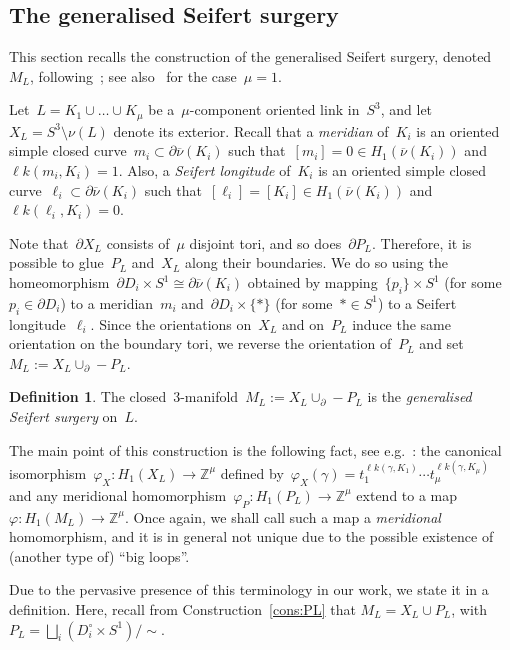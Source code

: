 \documentclass[10.9pt,a4paper]{amsart}
\theoremstyle{definition}
\newtheorem{definition}[theorem]{Definition}
\theoremstyle{remark}
\newcommand{\Z}{\mathbb{Z}}
\newcommand{\lk}{\ell k}
\newcommand{\onu}{\overline{\nu}}
\begin{document}
\color{black}

\subsection{The generalised Seifert surgery}
\label{subsec:M_L}
This section recalls the construction of the generalised Seifert surgery,  denoted $M_L$, following~\cite{ToffoliThesis,Toffoli,CMP,CFP}; see also~\cite{NagelPowell} for the case~$\mu=1$.
\medskip


Let~$L=K_1\cup\dots\cup K_\mu$ be a~$\mu$-component oriented link in~$S^3$, and let~$X_L=S^3\setminus\nu(L)$ denote its exterior.
Recall that a {\em meridian\/} of~$K_i$ is an oriented simple closed curve~$m_i\subset \partial\onu(K_i)$ such that~$[m_i]=0\in H_1(\onu(K_i))$ and~$\lk(m_i,K_i)=1$.
Also, a {\em Seifert longitude\/} of~$K_i$ is an oriented simple closed curve~$\ell_i\subset \partial\onu(K_i)$ such that~$[\ell_i]=[K_i]\in H_1(\onu(K_i))$ and~$\lk(\ell_i,K_i)=0$.

Note that~$\partial X_L$ consists of~$\mu$ disjoint tori, and so does~$\partial P_L$. Therefore, it is possible to glue~$P_L$ and~$X_L$ along their boundaries. We do so using the homeomorphism~$\partial D_i\times S^1\cong \partial\onu(K_i)$ obtained by mapping~$\{p_i\}\times S^1$ (for some~$p_i\in\partial D_i$) to a meridian~$m_i$ and~$\partial D_i\times\{\ast\}$ (for some~$\ast\in S^1$) to a Seifert longitude~$\ell_i$.
Since the orientations on~$X_L$ and on~$P_L$ induce the same orientation on the boundary tori, we reverse the orientation of~$P_L$ and set~$M_L:=X_L\cup_\partial -P_L$.

\begin{definition}
\label{def:ML}
The closed~3-manifold~$M_L:=X_L\cup_\partial -P_L$ is the {\em generalised Seifert surgery\/} on~$L$.
\end{definition}

The main point of this construction is the following fact, see e.g.~\cite[Lemma~2.11]{CMP}:
the canonical isomorphism~$\varphi_X\colon H_1(X_L)\to\Z^\mu$ defined by~$\varphi_X(\gamma)=t_1^{\lk(\gamma,K_1)} \cdots t_\mu^{\lk(\gamma,K_\mu)}$ and any meridional
homomorphism~$\varphi_P\colon H_1(P_L)\to\Z^\mu$ extend to a map~$\varphi\colon H_1(M_L)\to\Z^\mu$.
Once again, we shall call such a map a {\em meridional\/} homomorphism, and it is in general not unique
due to the possible existence of (another type of) ``big loops''.

Due to the pervasive presence of this terminology in our work, we state it in a definition.
Here, recall from Construction~\ref{cons:PL} that $M_L=X_L \cup P_L$, with~$P_L=\bigsqcup_i (D_i^\circ \times S^1)/\sim$.
\end{document}
